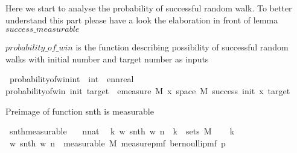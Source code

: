 \begin{isabellebody}
{\isafolddocument}%
%
\isadelimdocument
%
\endisadelimdocument
%
\begin{isamarkuptext}%
Here we start to analyse the probability of successful random walk. To better understand this
part please have a look the elaboration in front of lemma $success\_measurable$%
\end{isamarkuptext}\isamarkuptrue%
%
\begin{isamarkuptext}%
$probability\_of\_win$ is the function describing possibility of successful random walks with 
initial number and target number as inputs%
\end{isamarkuptext}\isamarkuptrue%
\isamarkupfalse%
\ probability{\isacharunderscore}{\kern0pt}of{\isacharunderscore}{\kern0pt}win{\isacharcolon}{\kern0pt}{\isacharcolon}{\kern0pt}{\isachardoublequoteopen}int\ {\isasymRightarrow}\ int\ {\isasymRightarrow}\ ennreal{\isachardoublequoteclose}\isanewline
{\isachardoublequoteopen}probability{\isacharunderscore}{\kern0pt}of{\isacharunderscore}{\kern0pt}win\ init\ target\ {\isacharequal}{\kern0pt}\ emeasure\ M\ {\isacharbraceleft}{\kern0pt}x{\isasymin}\ space\ M{\isachardot}{\kern0pt}\ success\ init\ x\ target{\isacharbraceright}{\kern0pt}{\isachardoublequoteclose}%
\isadelimdocument
%
\endisadelimdocument
%
\isatagdocument
%
\isamarkuptrue%
%
\endisatagdocument
{\isafolddocument}%
%
\isadelimdocument
%
\endisadelimdocument
%
\begin{isamarkuptext}%
Preimage of function snth is measurable%
\end{isamarkuptext}\isamarkuptrue%
\isamarkupfalse%
\ snth{\isacharunderscore}{\kern0pt}measurable{\isacharcolon}{\kern0pt}\isanewline
\ \ \ n{\isacharcolon}{\kern0pt}{\isacharcolon}{\kern0pt}nat\isanewline
\ \ k{\isachardot}{\kern0pt}\ {\isacharparenleft}{\kern0pt}{\isasymlambda}w{\isachardot}{\kern0pt}\ snth\ w\ n{\isacharparenright}{\kern0pt}\ {\isacharminus}{\kern0pt}{\isacharbackquote}{\kern0pt}\ {\isacharbraceleft}{\kern0pt}k{\isacharbraceright}{\kern0pt}\ {\isasymin}\ sets\ M{\isachardoublequoteclose}\isanewline
%
\isadelimproof
%
\endisadelimproof
%
\isatagproof
{}\isamarkupfalse%
{\isacharminus}{\kern0pt}\isanewline
\ \ \isamarkupfalse%
\ k\isanewline
\ \ \isamarkupfalse%
\ {\isachardoublequoteopen}{\isacharparenleft}{\kern0pt}{\isasymlambda}w{\isachardot}{\kern0pt}\ snth\ w\ n{\isacharparenright}{\kern0pt}\ {\isasymin}\ measurable\ M\ {\isacharparenleft}{\kern0pt}measure{\isacharunderscore}{\kern0pt}pmf\ {\isacharparenleft}{\kern0pt}bernoulli{\isacharunderscore}{\kern0pt}pmf\ p{\isacharparenright}{\kern0pt}{\isacharparenright}{\kern0pt}{\isachardoublequoteclose}\ \isanewline

\end{isabellebody}
